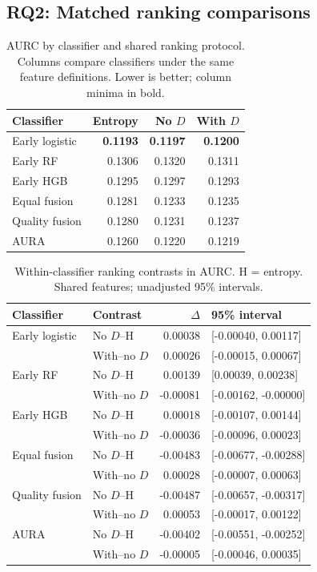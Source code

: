 \documentclass[conference]{IEEEtran}
\begin{document}
\subsection{RQ2: Matched ranking comparisons}
\begin{table}[t]
\caption{AURC by classifier and shared ranking protocol. Columns compare classifiers under the same feature definitions. Lower is better; column minima in bold.}
\label{tab:rank}
\centering\footnotesize
\begin{tabular}{@{}lrrr@{}}\toprule
Classifier & Entropy & No $D$ & With $D$\\\midrule
Early logistic & \textbf{0.1193} & \textbf{0.1197} & \textbf{0.1200}\\
Early RF & 0.1306 & 0.1320 & 0.1311\\
Early HGB & 0.1295 & 0.1297 & 0.1293\\
Equal fusion & 0.1281 & 0.1233 & 0.1235\\
Quality fusion & 0.1280 & 0.1231 & 0.1237\\
AURA & 0.1260 & 0.1220 & 0.1219\\\bottomrule
\end{tabular}
\end{table}
\begin{table}[t]
\caption{Within-classifier ranking contrasts in AURC. H = entropy. Shared features; unadjusted 95\% intervals.}
\label{tab:rankci}
\centering\footnotesize
\begin{tabular}{@{}llrl@{}}\toprule
Classifier & Contrast & $\Delta$ & 95\% interval\\\midrule
Early logistic & No $D$--H & 0.00038 & [-0.00040, 0.00117]\\
 & With--no $D$ & 0.00026 & [-0.00015, 0.00067]\\
Early RF & No $D$--H & 0.00139 & [0.00039, 0.00238]\\
 & With--no $D$ & -0.00081 & [-0.00162, -0.00000]\\
Early HGB & No $D$--H & 0.00018 & [-0.00107, 0.00144]\\
 & With--no $D$ & -0.00036 & [-0.00096, 0.00023]\\
Equal fusion & No $D$--H & -0.00483 & [-0.00677, -0.00288]\\
 & With--no $D$ & 0.00028 & [-0.00007, 0.00063]\\
Quality fusion & No $D$--H & -0.00487 & [-0.00657, -0.00317]\\
 & With--no $D$ & 0.00053 & [-0.00017, 0.00122]\\
AURA & No $D$--H & -0.00402 & [-0.00551, -0.00252]\\
 & With--no $D$ & -0.00005 & [-0.00046, 0.00035]\\\bottomrule
\end{tabular}
\end{table}
\end{document}
